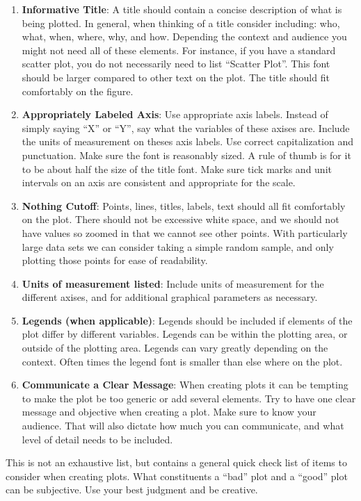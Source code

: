 \documentclass[
]{book}
\begin{document}
\begin{enumerate}
\def\labelenumi{\arabic{enumi})}
\item
  \textbf{Informative Title}: A title should contain a concise description of what is being plotted. In general, when thinking of a title consider including: who, what, when, where, why, and how. Depending the context and audience you might not need all of these elements. For instance, if you have a standard scatter plot, you do not necessarily need to list ``Scatter Plot''. This font should be larger compared to other text on the plot. The title should fit comfortably on the figure.
\item
  \textbf{Appropriately Labeled Axis}: Use appropriate axis labels. Instead of simply saying ``X'' or ``Y'', say what the variables of these axises are. Include the units of measurement on theses axis labels. Use correct capitalization and punctuation. Make sure the font is reasonably sized. A rule of thumb is for it to be about half the size of the title font. Make sure tick marks and unit intervals on an axis are consistent and appropriate for the scale.
\item
  \textbf{Nothing Cutoff}: Points, lines, titles, labels, text should all fit comfortably on the plot. There should not be excessive white space, and we should not have values so zoomed in that we cannot see other points. With particularly large data sets we can consider taking a simple random sample, and only plotting those points for ease of readability.
\item
  \textbf{Units of measurement listed}: Include units of measurement for the different axises, and for additional graphical parameters as necessary.
\item
  \textbf{Legends (when applicable)}: Legends should be included if elements of the plot differ by different variables. Legends can be within the plotting area, or outside of the plotting area. Legends can vary greatly depending on the context. Often times the legend font is smaller than else where on the plot.
\item
  \textbf{Communicate a Clear Message}: When creating plots it can be tempting to make the plot be too generic or add several elements. Try to have one clear message and objective when creating a plot. Make sure to know your audience. That will also dictate how much you can communicate, and what level of detail needs to be included.
\end{enumerate}

This is not an exhaustive list, but contains a general quick check list of items to consider when creating plots. What constituents a ``bad'' plot and a ``good'' plot can be subjective. Use your best judgment and be creative.
\end{document}
